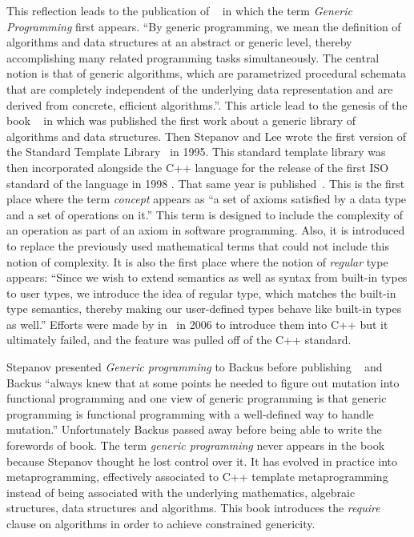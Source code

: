 This reflection leads to the publication of ~\parencite{musser.1988.generic} in which the
term \emph{Generic Programming} first appears. ``By generic programming, we mean the definition of algorithms and data
structures at an abstract or generic level, thereby accomplishing many related programming tasks simultaneously. The
central notion is that of generic algorithms, which are parametrized procedural schemata that are completely independent
of the underlying data representation and are derived from concrete, efficient algorithms.''. This article lead to the
genesis of the book ~\parencite{musser.1989.ada} in which was published the first work about
a generic library of algorithms and data structures. Then Stepanov and Lee wrote the first version of the Standard
Template Library~\parencite{stepanov.1995.standard} in 1995. This standard template library was then incorporated
alongside the C++ language for the release of the first ISO standard of the language in 1998 \parencite{iso.1998.cpp}.
That same year is published~\parencite{dehnert.1998.fundamentals}. This is the first place where the term \emph{concept}
appears as ``a set of axioms satisfied by a data type and a set of operations on it.'' This term is designed to include
the complexity of an operation as part of an axiom in software programming. Also, it is introduced to replace the
previously used mathematical terms that could not include this notion of complexity. It is also the first place where
the notion of \emph{regular} type appears: ``Since we wish to extend semantics as well as syntax from built-in types to
user types, we introduce the idea of regular type, which matches the built-in type semantics, thereby making our
user-defined types behave like built-in types as well.'' Efforts were made by \citeauthor{gregor.2006.concepts-art}
in~\parencite{gregor.2006.concepts-proc,gregor.2006.concepts-art} in 2006 to introduce them into C++ but it ultimately
failed, and the feature was pulled off of the C++ standard.

Stepanov presented \emph{Generic programming} to Backus before publishing
~\parencite{stepanov.2009.elements} and Backus ``always knew that at some points he
needed to figure out mutation into functional programming and one view of generic programming is that generic
programming is functional programming with a well-defined way to handle mutation.'' Unfortunately Backus passed away
before being able to write the forewords of  book. The term \emph{generic programming}
never appears in the book because Stepanov thought he lost control over it. It has evolved in practice into
metaprogramming, effectively associated to C++ template metaprogramming instead of being associated with the underlying
mathematics, algebraic structures, data structures and algorithms. This book introduces the \emph{require} clause on
algorithms in order to achieve constrained genericity.

